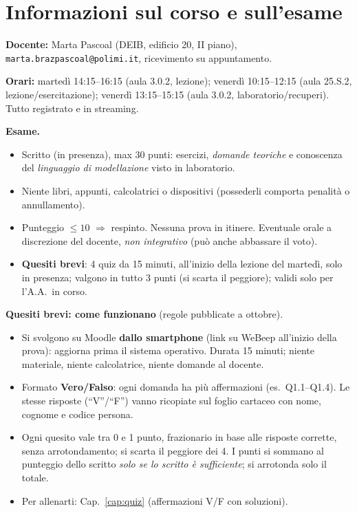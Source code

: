 \chapter*{Informazioni sul corso e sull'esame}

\textbf{Docente:} Marta Pascoal (DEIB, edificio 20, II piano), \texttt{marta.brazpascoal@polimi.it}, ricevimento su appuntamento.

\textbf{Orari:} martedì 14:15--16:15 (aula 3.0.2, lezione); venerdì 10:15--12:15 (aula 25.S.2, lezione/esercitazione); venerdì 13:15--15:15 (aula 3.0.2, laboratorio/recuperi). Tutto registrato e in streaming.

\textbf{Esame.}
\begin{itemize}[nosep]
  \item Scritto (in presenza), max 30 punti: esercizi, \emph{domande teoriche} e conoscenza del \emph{linguaggio di modellazione} visto in laboratorio.
  \item Niente libri, appunti, calcolatrici o dispositivi (possederli comporta penalità o annullamento).
  \item Punteggio $\le 10$ $\Rightarrow$ respinto. Nessuna prova in itinere. Eventuale orale a discrezione del docente, \emph{non integrativo} (può anche abbassare il voto).
  \item \textbf{Quesiti brevi}: 4 quiz da 15 minuti, all'inizio della lezione del martedì, solo in presenza; valgono in tutto 3 punti (si scarta il peggiore); validi solo per l'A.A.\ in corso.
\end{itemize}

\textbf{Quesiti brevi: come funzionano} (regole pubblicate a ottobre).
\begin{itemize}[nosep]
  \item Si svolgono su Moodle \textbf{dallo smartphone} (link su WeBeep all'inizio della prova): aggiorna prima il sistema operativo. Durata 15 minuti; niente materiale, niente calcolatrice, niente domande al docente.
  \item Formato \textbf{Vero/Falso}: ogni domanda ha più affermazioni (es.\ Q1.1--Q1.4). Le stesse risposte (``V''/``F'') vanno ricopiate sul foglio cartaceo con nome, cognome e codice persona.
  \item Ogni quesito vale tra 0 e 1 punto, frazionario in base alle risposte corrette, senza arrotondamento; si scarta il peggiore dei 4. I punti si sommano al punteggio dello scritto \emph{solo se lo scritto è sufficiente}; si arrotonda solo il totale.
  \item Per allenarti: Cap.~\ref{cap:quiz} (affermazioni V/F con soluzioni).
\end{itemize}

